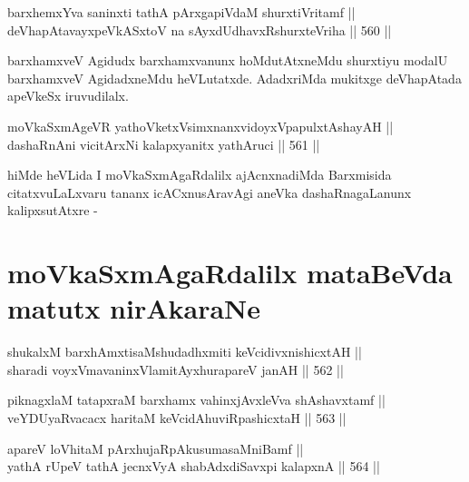\begin{shl}
barxhemxYva saninxti tathA pArxgapiVdaM shurxtiVritamf || \\
deVhapAtavayxpeVkASx\s toV na sAyxdUdhavxRshurxteVriha \hfill || 560 ||  
\end{shl}

\begin{artha}
barxhamxveV Agidudx barxhamxvanunx hoMdutAtxneMdu shurxtiyu modalU barxhamxveV AgidadxneMdu heVLutatxde. AdadxriMda mukitxge deVhapAtada apeVkeSx iruvudilalx.
\end{artha}


\begin{shl}
moVkaSxmAgeVR yathoVketxV\s simxnanxvidoyxVpapulxtAshayAH || \\
dashaRnAni vicitArxNi kalapxyanitx yathAruci \hfill || 561 ||  
\end{shl}

\begin{artha}
hiMde heVLida I moVkaSxmAgaRdalilx ajAcnxnadiMda Barxmisida
citatxvuLaLxvaru tananx icACxnusAravAgi aneVka dashaRnagaLanunx
kalipxsutAtxre -
\end{artha}

\section*{moVkaSxmAgaRdalilx mataBeVda matutx nirAkaraNe}


\begin{shl}
shukalxM barxhAmxtisaMshudadhxmiti keVcidivxnishicxtAH || \\
sharadi voyxVmavaninxVlamitAyxhurapareV janAH \hfill || 562 ||  
\end{shl}

\begin{shl}
piknagxlaM tatapxraM barxhamx vahinxjAvxleVva shAshavxtamf || \\
veYDUyaRvacacx haritaM keVcidAhuviRpashicxtaH \hfill || 563 ||  
\end{shl}

\begin{shl}
apareV loVhitaM pArxhujaRpAkusumasaMniBamf || \\
yathA rUpeV tathA jecnxVyA shabAdxdiSavxpi kalapxnA \hfill || 564 ||  
\end{shl}

